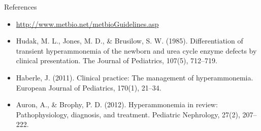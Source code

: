 \documentclass[presentation, smaller]{beamer}
\begin{document}
\begin{frame}[label={sec:orgheadline20}]{References}
\begin{itemize}
\item \url{http://www.metbio.net/metbioGuidelines.asp}
\item Hudak, M. L., Jones, M. D., \& Brusilow, S. W. (1985).
Differentiation of transient hyperammonemia of the newborn and urea
cycle enzyme defects by clinical presentation. The Journal of
Pediatrics, 107(5), 712–719.
\item Haberle, J. (2011). Clinical practice: The management of
hyperammonemia. European Journal of Pediatrics, 170(1), 21–34.
\item Auron, A., \& Brophy, P. D. (2012). Hyperammonemia in review:
Pathophysiology, diagnosis, and treatment. Pediatric Nephrology,
27(2), 207–222.
\end{itemize}
\end{frame}
\end{document}
